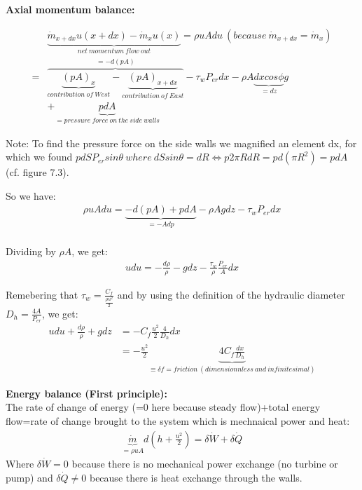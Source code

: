 \textbf{Axial momentum balance:} 

\begin{equation}
\begin{aligned}
&\underbrace{\dot{m}_{x+dx}u(x+dx)-\dot{m}_{x}u(x)}_{net\ momentum\ flow\ out}=\rho u Adu\ (because\ \dot{m}_{x+dx}=\dot{m}_{x})\\
=&\overbrace{\underbrace{(pA)_x}_{contribution\ of\ West}-\underbrace{(pA)_{x+dx}}_{contribution\ of\ East}}^{=-d(pA)} -\tau_w P_{er} dx -\rho A \underbrace{dx cos\phi}_{=dz} g\\
&+\underbrace{pdA}_{=pressure\ force\ on\ the\ side\ walls}
\end{aligned}
\end{equation}

Note: To find the pressure force on the side walls we magnified an element dx, for which we found $pdSP_{er}sin \theta\ where\  dS sin \theta=dR \Leftrightarrow p2 \pi RdR=pd(\pi R^2)=pdA$ (cf. figure 7.3).

So we have:
\begin{equation}
\begin{aligned}
\rho u Adu=\underbrace{-d(pA)+pdA}_{=-Adp}-\rho Agdz- \tau_w P_{er} dx \\
\end{aligned}
\end{equation}

Dividing by $\rho A$, we get:
\begin{equation}
\begin{aligned}
udu=-\frac{d\rho}{\rho}-gdz-\frac{\tau_w}{\rho} \frac{P_{er}}{A}dx
\end{aligned}
\end{equation}

Remebering that $\tau_w=\frac{C_f}{\frac{\rho u^2}{2}}$ and by using the definition of the hydraulic diameter $D_h=\frac{4A}{P_{er}}$, we get:
\begin{equation}
\begin{aligned}
udu+\frac{d\rho}{\rho}+gdz&=-C_f \frac{u^2}{2} \frac{4}{D_h}dx
\\
&= -\frac{u^2}{2} \underbrace{4C_f  \frac{dx}{D_h}}_{\equiv \delta f=friction\ (dimensionnless\ and\ infinitesimal)}
\end{aligned} 
\end{equation}

\textbf{Energy balance (First principle):}
\\

The rate of change of energy (=0 here because steady flow)+total energy flow=rate of change brought to the system which is mechnaical power and heat:
\begin{equation}
\begin{aligned}
\underbrace{\dot{m}}_{=\rho u A} d(h+\frac{u^2}{2})=\delta \dot{W} +\delta \dot{Q}
\end{aligned} 
\end{equation}
Where $\delta \dot{W}=0$ because there is no mechanical power exchange (no turbine or pump) and $\delta \dot{Q} \neq 0$ because there is heat exchange through the walls.
\\

